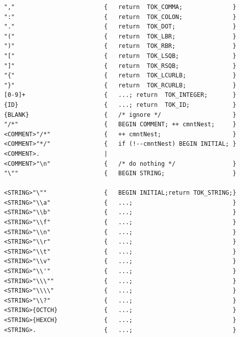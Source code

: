 \begin{verbatim}
","                         {   return  TOK_COMMA;              }
":"                         {   return  TOK_COLON;              }
"."                         {   return  TOK_DOT;                }
"("                         {   return  TOK_LBR;                }
")"                         {   return  TOK_RBR;                }
"["                         {   return  TOK_LSQB;               }
"]"                         {   return  TOK_RSQB;               }
"{"                         {   return  TOK_LCURLB;             }
"}"                         {   return  TOK_RCURLB;             }
[0-9]+                      {   ...; return  TOK_INTEGER;       }
{ID}                        {   ...; return  TOK_ID;            }
{BLANK}                     {   /* ignore */                    }
"/*"                        {   BEGIN COMMENT; ++ cmntNest;     }
<COMMENT>"/*"               {   ++ cmntNest;                    }
<COMMENT>"*/"               {   if (!--cmntNest) BEGIN INITIAL; }
<COMMENT>.                  |
<COMMENT>"\n"               {   /* do nothing */                }
"\""                        {   BEGIN STRING;                   }

<STRING>"\""                {   BEGIN INITIAL;return TOK_STRING;}
<STRING>"\\a"               {   ...;                            }
<STRING>"\\b"               {   ...;                            }
<STRING>"\\f"               {   ...;                            }
<STRING>"\\n"               {   ...;                            }
<STRING>"\\r"               {   ...;                            }
<STRING>"\\t"               {   ...;                            }
<STRING>"\\v"               {   ...;                            }
<STRING>"\\'"               {   ...;                            }
<STRING>"\\\""              {   ...;                            }
<STRING>"\\\\"              {   ...;                            }
<STRING>"\\?"               {   ...;                            }
<STRING>{OCTCH}             {   ...;                            }
<STRING>{HEXCH}             {   ...;                            }
<STRING>.                   {   ...;                            }

\end{verbatim}


